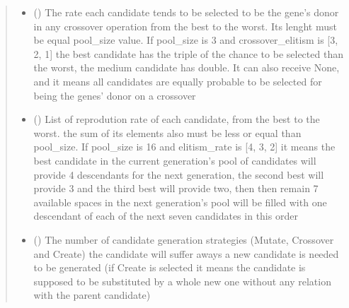 \documentclass[letterpaper,10pt,english]{sphinxmanual}
\begin{document}
\begin{fulllineitems}
\begin{quote}
\begin{description}
\begin{itemize}
\item {} 
\sphinxAtStartPar
{} (\sphinxstyleliteralemphasis{\sphinxupquote{{[}}}\sphinxstyleliteralemphasis{\sphinxupquote{{[}}}\sphinxstyleliteralemphasis{\sphinxupquote{{]}}}\sphinxstyleliteralemphasis{\sphinxupquote{, }}\sphinxstyleliteralemphasis{\sphinxupquote{{]}}}) \textendash{} The rate each candidate tends to be selected to be the gene’s donor in any crossover
operation from the best to the worst. Its lenght must be equal pool\_size value. If pool\_size is 3 and
crossover\_elitism is {[}3, 2, 1{]} the best candidate has the triple of the chance to be selected than the
worst, the medium candidate has double. It can also receive None, and it means all candidates are equally
probable to be selected for being the genes’ donor on a crossover

\item {} 
\sphinxAtStartPar
{} (\sphinxstyleliteralemphasis{\sphinxupquote{{[}}}\sphinxstyleliteralemphasis{\sphinxupquote{{[}}}\sphinxstyleliteralemphasis{\sphinxupquote{{]}}}\sphinxstyleliteralemphasis{\sphinxupquote{, }}\sphinxstyleliteralemphasis{\sphinxupquote{{]}}}) \textendash{} List of reprodution rate of each candidate, from the best to the worst. the sum of its
elements also must be less or equal than pool\_size. If pool\_size is 16 and elitism\_rate is {[}4, 3, 2{]} it
means the best candidate in the current generation’s pool of candidates will provide 4 descendants for the
next generation, the second best will provide 3 and the third best will provide two, then then remain 7
available spaces in the next generation’s pool will be filled with one descendant of each of the next seven
candidates in this order

\item {} 
\sphinxAtStartPar
{} () \textendash{} The number of candidate generation strategies (Mutate, Crossover and Create) the candidate
will suffer aways a new candidate is needed to be generated (if Create is selected it means the candidate is
supposed to be substituted by a whole new one without any relation with the parent candidate)


\end{itemize}
\end{description}
\end{quote}
\end{fulllineitems}
\end{document}
